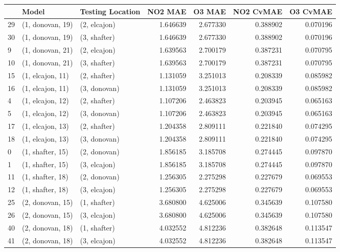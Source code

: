 \begin{tabular}{lllrrrr}
\toprule
{} &             Model & Testing Location &   NO2 MAE &    O3 MAE &  NO2 CvMAE &  O3 CvMAE \\
\midrule
29 &  (1, donovan, 19) &     (2, elcajon) &  1.646639 &  2.677330 &   0.388902 &  0.070196 \\
30 &  (1, donovan, 19) &     (3, shafter) &  1.646639 &  2.677330 &   0.388902 &  0.070196 \\
9  &  (1, donovan, 21) &     (2, elcajon) &  1.639563 &  2.700179 &   0.387231 &  0.070795 \\
10 &  (1, donovan, 21) &     (3, shafter) &  1.639563 &  2.700179 &   0.387231 &  0.070795 \\
15 &  (1, elcajon, 11) &     (2, shafter) &  1.131059 &  3.251013 &   0.208339 &  0.085982 \\
16 &  (1, elcajon, 11) &     (3, donovan) &  1.131059 &  3.251013 &   0.208339 &  0.085982 \\
4  &  (1, elcajon, 12) &     (2, shafter) &  1.107206 &  2.463823 &   0.203945 &  0.065163 \\
5  &  (1, elcajon, 12) &     (3, donovan) &  1.107206 &  2.463823 &   0.203945 &  0.065163 \\
17 &  (1, elcajon, 13) &     (2, shafter) &  1.204358 &  2.809111 &   0.221840 &  0.074295 \\
18 &  (1, elcajon, 13) &     (3, donovan) &  1.204358 &  2.809111 &   0.221840 &  0.074295 \\
0  &  (1, shafter, 15) &     (2, donovan) &  1.856185 &  3.185708 &   0.274445 &  0.097870 \\
1  &  (1, shafter, 15) &     (3, elcajon) &  1.856185 &  3.185708 &   0.274445 &  0.097870 \\
11 &  (1, shafter, 18) &     (2, donovan) &  1.256305 &  2.275298 &   0.227679 &  0.069553 \\
12 &  (1, shafter, 18) &     (3, elcajon) &  1.256305 &  2.275298 &   0.227679 &  0.069553 \\
25 &  (2, donovan, 15) &     (1, shafter) &  3.680800 &  4.625006 &   0.345639 &  0.107580 \\
26 &  (2, donovan, 15) &     (3, elcajon) &  3.680800 &  4.625006 &   0.345639 &  0.107580 \\
40 &  (2, donovan, 18) &     (1, shafter) &  4.032552 &  4.812236 &   0.382648 &  0.113547 \\
41 &  (2, donovan, 18) &     (3, elcajon) &  4.032552 &  4.812236 &   0.382648 &  0.113547 \\

\end{tabular}
